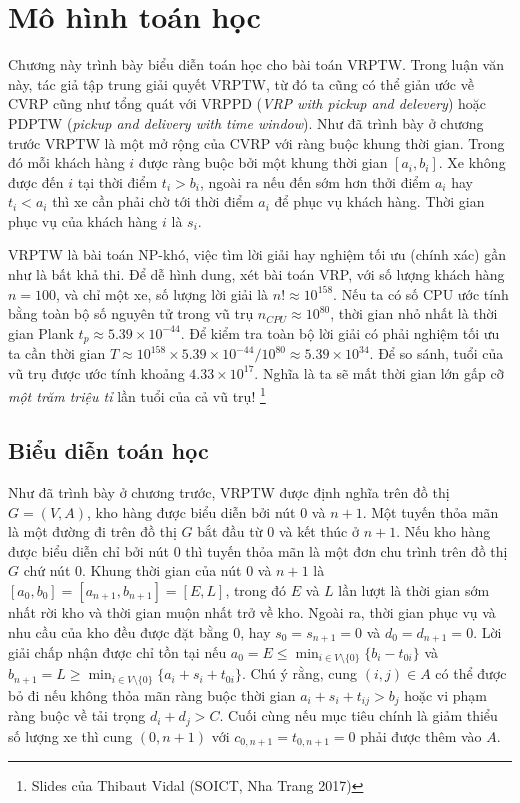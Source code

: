 \chapter{Mô hình toán học}
Chương này trình bày biểu diễn toán học cho bài toán VRPTW. Trong luận văn này, tác giả tập trung giải quyết VRPTW, từ đó ta cũng có thể giản ước về CVRP cũng như tổng quát với VRPPD (\textit{VRP with pickup and delevery}) hoặc PDPTW (\textit{pickup and delivery with time window}). Như đã trình bày ở chương trước VRPTW là một mở rộng của CVRP với ràng buộc khung thời gian. Trong đó mỗi khách hàng $i$ được ràng buộc bởi một khung thời gian $[a_i,b_i]$. Xe không được đến $i$ tại thời điểm $t_i > b_i$, ngoài ra nếu đến sớm hơn thởi điểm $a_i$ hay $t_i < a_i$ thì xe cần phải chờ tới thời điểm $a_i$ để phục vụ khách hàng. Thời gian phục vụ của khách hàng $i$ là $s_i$.

VRPTW là bài toán NP-khó, việc tìm lời giải hay nghiệm tối ưu (chính xác) gần như là bất khả thi. Để dễ hình dung, xét bài toán VRP, với số lượng khách hàng $n=100$, và chỉ một xe, số lượng lời giải là $n! \approx 10^{158}$. Nếu ta có số CPU ước tính bằng toàn bộ số nguyên tử trong vũ trụ $n_{CPU} \approx 10^{80}$, thời gian nhỏ nhất là thời gian Plank $t_p \approx 5.39 \times 10^{-44}$. Để kiểm tra toàn bộ lời giải có phải nghiệm tối ưu ta cần thời gian $T \approx 10^{158} \times 5.39 \times 10^{-44} / 10^{80} \approx 5.39 \times 10^{34}$. Để so sánh, tuổi của vũ trụ được ước tính khoảng $4.33 \times 10^{17}$. Nghĩa là ta sẽ mất thời gian lớn gấp cỡ \textit{một trăm triệu tỉ} lần tuổi của cả vũ trụ! \footnote[1]{Slides của Thibaut Vidal (SOICT, Nha Trang 2017)}

\section{Biểu diễn toán học}
Như đã trình bày ở chương trước, VRPTW được định nghĩa trên đồ thị $G = (V, A)$, kho hàng được biểu diễn bởi nút $0$ và $n+1$. Một tuyến thỏa mãn là một đường đi trên đồ thị $G$ bắt đầu từ $0$ và kết thúc ở $n+1$. Nếu kho hàng được biểu diễn chỉ bởi nút $0$ thì tuyến thỏa mãn là một đơn chu trình trên đồ thị $G$ chứ nút $0$. Khung thời gian của nút $0$ và $n+1$ là $[a_0, b_0] = [a_{n+1}, b_{n+1}] = [E, L]$, trong đó $E$ và $L$ lần lượt là thời gian sớm nhất rời kho và thời gian muộn nhất trở về kho. Ngoài ra, thời gian phục vụ và nhu cầu của kho đều được đặt bằng 0, hay $s_0 = s_{n+1} = 0$ và $d_0 = d_{n+1} = 0$. Lời giải chấp nhận được chỉ tồn tại nếu $a_0 = E \leq \min_{i \in V \setminus \{0\}} \{b_i - t_{0i}\}$ và $b_{n+1} = L \geq \min_{i \in V \setminus \{0\}} \{ a_i + s_i + t_{0i} \}$. Chú ý rằng, cung $(i,j) \in A$ có thể được bỏ đi nếu không thỏa mãn ràng buộc thời gian $a_i + s_i + t_{ij} > b_j$ hoặc vi phạm ràng buộc về tải trọng $d_i + d_j > C$. Cuối cùng nếu mục tiêu chính là giảm thiểu số lượng xe thì cung $(0,n+1)$ với $c_{0,n+1} = t_{0,n+1} = 0$ phải được thêm vào $A$.

